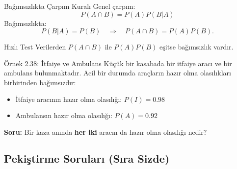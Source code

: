 \documentclass[light]{lutbeamer}
\begin{document}
\begin{frame}[fragile]{Bağımsızlıkta Çarpım Kuralı}
    Genel çarpım:
    \[
    P(A\cap B)=P(A)P(B|A)
    \]
    Bağımsızlıkta:
    \[
    P(B|A)=P(B)\quad \Rightarrow\quad P(A\cap B)=P(A)P(B).
    \]

    \begin{block}{Hızlı Test}
        Verilerden \(P(A\cap B)\) ile \(P(A)P(B)\) eşitse bağımsızlık vardır.
    \end{block}
\end{frame}

\begin{frame}{Örnek 2.38: İtfaiye ve Ambulans}
    \small
    Küçük bir kasabada bir itfaiye aracı ve bir ambulans bulunmaktadır. Acil bir durumda araçların hazır olma olasılıkları birbirinden bağımsızdır:
    \begin{itemize}
        \item İtfaiye aracının hazır olma olasılığı: $P(I) = 0.98$
        \item Ambulansın hazır olma olasılığı: $P(A) = 0.92$
    \end{itemize}


    \vspace{0.2cm}
    \textbf{Soru:} Bir kaza anında \textbf{her iki} aracın da hazır olma olasılığı nedir?

\end{frame}

\subsection{Pekiştirme Soruları (Sıra Sizde)}
\end{document}
